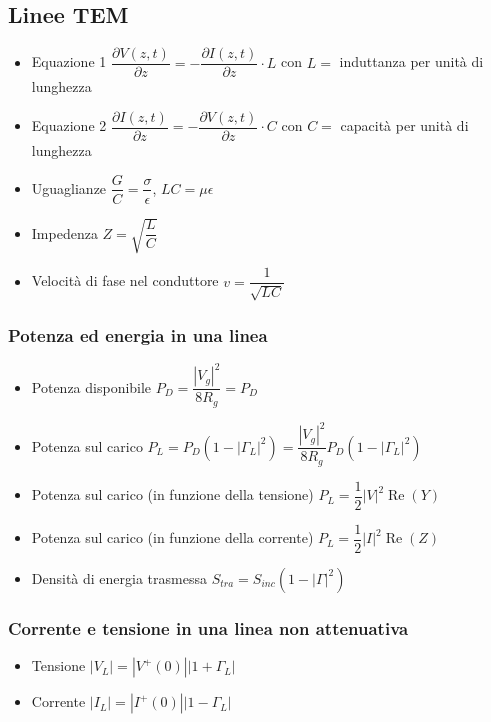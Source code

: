 \documentclass{article}
\begin{document}
\subsection{Linee TEM}
\begin{itemize}
	\item Equazione 1 \( \dfrac{\partial V(z, t)}{\partial z} = - \dfrac{\partial I(z, t)}{\partial z} \cdot L\) con \(L = \) induttanza per unità di lunghezza
	\item Equazione 2 \( \dfrac{\partial I(z, t)}{\partial z} = - \dfrac{\partial V(z, t)}{\partial z} \cdot C\) con \(C = \) capacità per unità di lunghezza
	\item Uguaglianze \( \dfrac{G}{C} = \dfrac{\sigma}{\epsilon} \), \(L C = \mu \epsilon  \)
	\item Impedenza \( Z = \sqrt{\dfrac{L}{C}} \)
	\item Velocità di fase nel conduttore \( v = \dfrac{1}{\sqrt{LC}} \)
\end{itemize}

\subsubsection{Potenza ed energia in una linea}
\begin{itemize}
	\item Potenza disponibile \( P_D = \dfrac{|V_g|^2}{8 R_g} = P_D \)
	\item Potenza sul carico \( P_L = P_D ( 1 - | \Gamma_L | ^ 2 ) = \dfrac{|V_g|^2}{8 R_g} P_D ( 1 - | \Gamma_L | ^ 2 ) \) 
	\item Potenza sul carico (in funzione della tensione) \( P_L = \dfrac{1}{2} |V|^2  \operatorname{Re}(Y) \)
	\item Potenza sul carico (in funzione della corrente) \( P_L = \dfrac{1}{2} |I|^2  \operatorname{Re}(Z) \)
	\item Densità di energia trasmessa \( S_{tra} = S_{inc} \left( 1 - \left|\Gamma \right| ^ 2 \right) \) 
\end{itemize}

\subsubsection{Corrente e tensione in una linea non attenuativa}
\begin{itemize}
	\item Tensione \(|V_L| = \left| V^+(0) \right| \left|1 + \Gamma_L \right|\)
	\item Corrente \(|I_L| = \left| I^+(0) \right| \left|1 - \Gamma_L \right|\)
\end{itemize}
\end{document}
